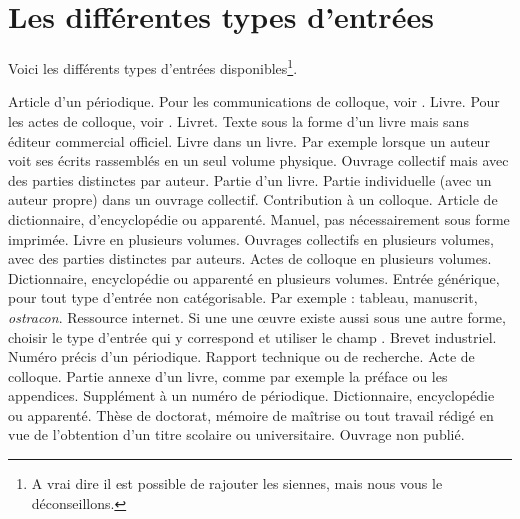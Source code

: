\section{Les différentes types d'entrées}
Voici les différents types d'entrées disponibles\footnote{A vrai dire il est possible de rajouter les siennes, mais nous vous le déconseillons.}.


\begin{fieldlist}

Article d'un périodique. Pour les communications de colloque, voir .
Livre. Pour les actes de colloque, voir  . 
	Livret. Texte sous la forme d'un livre mais sans éditeur commercial officiel.
	Livre dans un livre. Par exemple lorsque un auteur  voit ses écrits rassemblés en un seul volume physique. 	
	Ouvrage collectif mais avec des parties distinctes par auteur.
	Partie d'un livre.
	Partie individuelle (avec un auteur propre) dans un ouvrage collectif.
	 Contribution à un colloque.
	 Article de dictionnaire, d'encyclopédie ou apparenté.
	 Manuel, pas nécessairement sous forme imprimée.
	 Livre en plusieurs volumes.
	 Ouvrages collectifs en plusieurs volumes, avec des parties distinctes par auteurs.
	 Actes de colloque en plusieurs volumes.
	 Dictionnaire, encyclopédie ou apparenté en plusieurs volumes.
	 Entrée générique, pour tout type d'entrée non catégorisable. Par exemple : tableau, manuscrit, \emph{ostracon}. 
	Ressource internet. Si une une œuvre existe aussi sous une autre forme, choisir le type d'entrée qui y correspond et utiliser le champ .
	Brevet industriel.
	Numéro précis d'un périodique.	
	Rapport technique ou de recherche.
	Acte de colloque.
	Partie annexe d'un livre, comme par exemple la préface ou les appendices.
	Supplément à un numéro de périodique.
	Dictionnaire, encyclopédie ou apparenté.
	Thèse de doctorat, mémoire de maîtrise ou tout travail rédigé en vue de l'obtention d'un titre scolaire ou universitaire.
	Ouvrage non publié.
\end{fieldlist}

